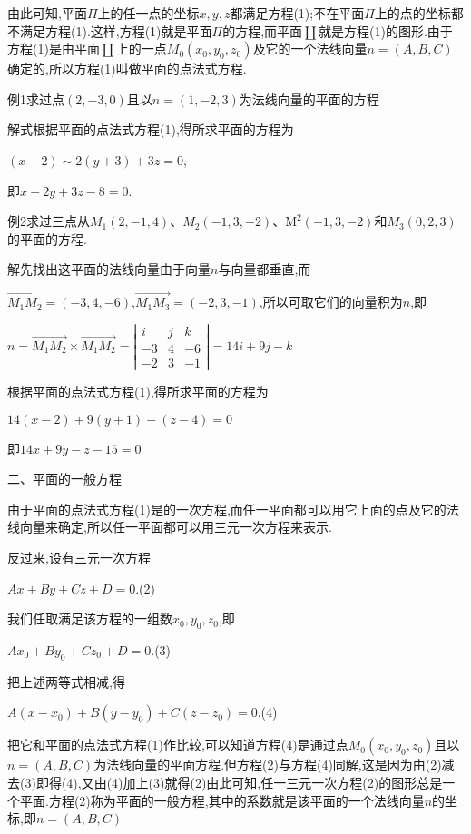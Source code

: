 \documentclass[oneside]{book}
\begin{document}
由此可知,平面$\Pi $上的任一点的坐标$x,y,z$都满足方程(1);不在平面$\Pi $上的点的坐标都不满足方程(1).这样,方程(1)就是平面$\Pi $的方程,而平面$\coprod $就是方程(1)的图形.由于方程(1)是由平面$\coprod $上的一点${M_0}({x_0},{y_0},{z_0})$及它的一个法线向量$n=(A,B,C)$确定的,所以方程(1)叫做平面的点法式方程.

例1求过点$(2,-3,0)$且以$n=(1,-2,3)$为法线向量的平面的方程

解式根据平面的点法式方程(1),得所求平面的方程为

$(x-2) \sim 2(y+3)+3 z=0$,

即$x - 2y + 3z - 8 = 0$.

例2求过三点从$M_{1}(2,-1,4)$、$M_{2}(-1,3,-2)$、$\mathrm{M}^{2}(-1,3,-2)$和$M_{3}(0,2,3)$的平面的方程.

解先找出这平面的法线向量由于向量$n$与向量都垂直,而

$\overrightarrow {{M_1}{M_2}}  = ( - 3,4, - 6)$,$\overrightarrow {{M_1}{M_3}}  = ( - 2,3, - 1)$,所以可取它们的向量积为$n$,即

$n=\overrightarrow{M_{1} M_{2}} \times \overrightarrow{M_{1} M_{2}}=\left|\begin{array}{ccc}{i} & {j} & {k} \\ {-3} & {4} & {-6} \\ {-2} & {3} & {-1}\end{array}\right|=14 i+9 j-k$

根据平面的点法式方程(1),得所求平面的方程为

$14(x - 2) + 9(y + 1) - (z - 4) = 0$

即$14x + 9y - z - 15 = 0$

二、平面的一般方程

由于平面的点法式方程(1)是的一次方程,而任一平面都可以用它上面的点及它的法线向量来确定,所以任一平面都可以用三元一次方程来表示.

反过来,设有三元一次方程

$Ax + By + Cz + D = 0$.(2)

我们任取满足该方程的一组数${x_0},{y_0},{z_0}$,即

$A{x_0} + B{y_0} + C{z_0} + D = 0$.(3)

把上述两等式相减,得

$A(x - {x_0}) + B\left( {y - {y_0}} \right) + C\left( {z - {z_0}} \right) = 0$.(4)

把它和平面的点法式方程(1)作比较,可以知道方程(4)是通过点${M_0}({x_0},{y_0},{z_0})$且以$n=(A,B,C)$为法线向量的平面方程.但方程(2)与方程(4)同解,这是因为由(2)减去(3)即得(4),又由(4)加上(3)就得(2)由此可知,任一三元一次方程(2)的图形总是一个平面.方程(2)称为平面的一般方程,其中的系数就是该平面的一个法线向量$n$的坐标,即$n=(A,B,C)$
\end{document}
